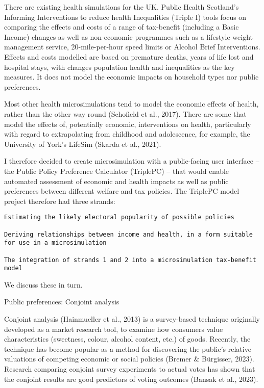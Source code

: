 \documentclass[
  letterpaper,
  DIV=11,
  numbers=noendperiod]{scrartcl}
\begin{document}
There are existing health simulations for the UK. Public Health
Scotland's Informing Interventions to reduce health Inequalities (Triple
I) tools focus on comparing the effects and costs of a range of
tax-benefit (including a Basic Income) changes as well as non-economic
programmes such as a lifestyle weight management service,
20-mile-per-hour speed limits or Alcohol Brief Interventions. Effects
and costs modelled are based on premature deaths, years of life lost and
hospital stays, with changes population health and inequalities as the
key measures. It does not model the economic impacts on household types
nor public preferences.

Most other health microsimulations tend to model the economic effects of
health, rather than the other way round (Schofield et al., 2017). There
are some that model the effects of, potentially economic, interventions
on health, particularly with regard to extrapolating from childhood and
adolescence, for example, the University of York's LifeSim (Skarda et
al., 2021).

I therefore decided to create microsimulation with a public-facing user
interface -- the Public Policy Preference Calculator (TriplePC) -- that
would enable automated assessment of economic and health impacts as well
as public preferences between different welfare and tax policies. The
TriplePC model project therefore had three strands:

\begin{verbatim}
Estimating the likely electoral popularity of possible policies 

Deriving relationships between income and health, in a form suitable for use in a microsimulation 

The integration of strands 1 and 2 into a microsimulation tax-benefit model 
\end{verbatim}

We discuss these in turn.

Public preferences: Conjoint analysis

Conjoint analysis (Hainmueller et al., 2013) is a survey-based technique
originally developed as a market research tool, to examine how consumers
value characteristics (sweetness, colour, alcohol content, etc.) of
goods. Recently, the technique has become popular as a method for
discovering the public's relative valuations of competing economic or
social policies (Bremer \& Bürgisser, 2023). Research comparing conjoint
survey experiments to actual votes has shown that the conjoint results
are good predictors of voting outcomes (Bansak et al., 2023).
\end{document}
